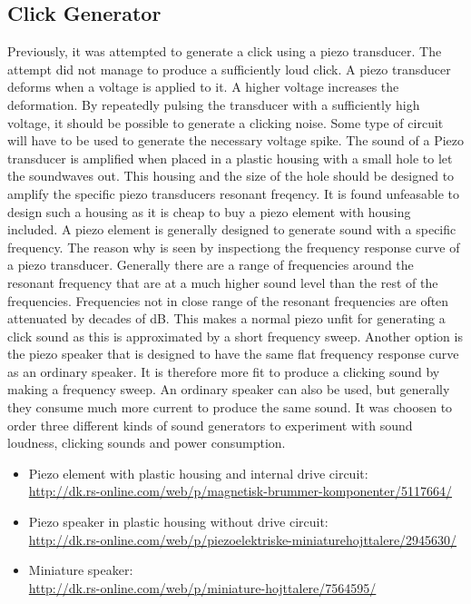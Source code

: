 \subsection{Click Generator} %
\label{sub:click_generator}
Previously, it was attempted to generate a click using a piezo transducer.
The attempt did not manage to produce a sufficiently loud click.
A piezo transducer deforms when a voltage is applied to it.
A higher voltage increases the deformation.
By repeatedly pulsing the transducer with a sufficiently high voltage, it should be possible to generate a clicking noise.
Some type of circuit will have to be used to generate the necessary voltage spike.
The sound of a Piezo transducer is amplified when placed in a plastic housing with a small hole to let the soundwaves out.
This housing and the size of the hole should be designed to amplify the specific piezo transducers resonant freqency.
It is found unfeasable to design such a housing as it is cheap to buy a piezo element with housing included.
A piezo element is generally designed to generate sound with a specific frequency.
The reason why is seen by inspectiong the frequency response curve of a piezo transducer.
Generally there are a range of frequencies around the resonant frequency that are at a much higher sound level than the rest of the frequencies.
Frequencies not in close range of the resonant frequencies are often attenuated by decades of dB.
This makes a normal piezo unfit for generating a click sound as this is approximated by a short frequency sweep.
Another option is the piezo speaker that is designed to have the same flat frequency response curve as an ordinary speaker.
It is therefore more fit to produce a clicking sound by making a frequency sweep.
An ordinary speaker can also be used, but generally they consume much more current to produce the same sound.
It was choosen to order three different kinds of sound generators to experiment with sound loudness, clicking sounds and power consumption.
\begin{itemize}
  \item Piezo element with plastic housing and internal drive circuit:\\
        \url{http://dk.rs-online.com/web/p/magnetisk-brummer-komponenter/5117664/}
  \item Piezo speaker in plastic housing without drive circuit: \\
        \url{http://dk.rs-online.com/web/p/piezoelektriske-miniaturehojttalere/2945630/}
  \item Miniature speaker:\\
          \url{http://dk.rs-online.com/web/p/miniature-hojttalere/7564595/}
\end{itemize}
